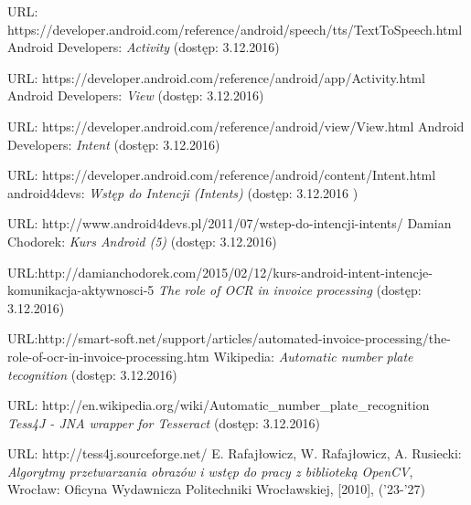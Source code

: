 \documentclass[eng,oneside]{mgr}
\begin{document}
\begin{thebibliography}{99}
\par URL: https://developer.android.com/reference/android/speech/tts/TextToSpeech.html
 Android Developers: \emph{Activity} (dostęp: 3.12.2016) 
\par URL: https://developer.android.com/reference/android/app/Activity.html
 Android Developers: \emph{View} (dostęp: 3.12.2016) 
\par URL: https://developer.android.com/reference/android/view/View.html
 Android Developers: \emph{Intent} (dostęp: 3.12.2016) 
\par URL: https://developer.android.com/reference/android/content/Intent.html
 android4devs: \emph{Wstęp do Intencji (Intents)} (dostęp: 3.12.2016 )
\par URL: http://www.android4devs.pl/2011/07/wstep-do-intencji-intents/
 Damian Chodorek: \emph{Kurs Android (5)} (dostęp: 3.12.2016) 
\par URL:\hspace{0.1cm}http://damianchodorek.com/2015/02/12/kurs-android-intent-intencje-komunikacja-aktywnosci-5
 \emph{The role of OCR in invoice processing} (dostęp: 3.12.2016)
\par URL:\hspace{0.1cm}http://smart-soft.net/support/articles/automated-invoice-processing/the-role-of-ocr-in-invoice-processing.htm
 Wikipedia: \emph{Automatic number plate tecognition} (dostęp: 3.12.2016)
\par URL: http://en.wikipedia.org/wiki/Automatic\_number\_plate\_recognition
 \emph {Tess4J - JNA wrapper for Tesseract} (dostęp: 3.12.2016)
\par URL: http://tess4j.sourceforge.net/
 E. Rafajłowicz, W. Rafajłowicz, A. Rusiecki: \emph{Algorytmy przetwarzania obrazów i wstęp do pracy z biblioteką OpenCV}, Wrocław: Oficyna Wydawnicza Politechniki Wrocławskiej, [2010], ('23-'27)

\end{thebibliography}
\end{document}
